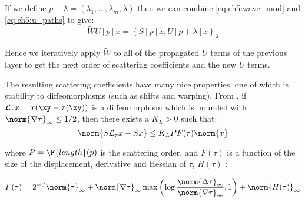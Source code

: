If we define $p + \lambda = (\lambda_1, \ldots, \lambda_m, \lambda)$ then we can
combine \eqref{eq:ch5:wave_mod} and \eqref{eq:ch5:u_paths} to give:
%
\begin{equation}
  \tilde{W} U[p] x = \left\{S[p]x, U[p+\lambda]x \right\}_{\lambda}
\end{equation}

Hence we iteratively apply $\tilde{W}$ to all of the propagated $U$ terms of
the previous layer to get the next order of scattering coefficients and
the new $U$ terms.

The resulting scattering coefficients have many nice properties, one of which is
stability to diffeomorphisms (such as shifts and warping). From
\cite{mallat_group_2012}, if $\mathcal{L}_\tau
x = x(\xy -\tau(\xy))$ is a diffeomorphism which is bounded with 
$\norm{\nabla \tau}_{\infty} \leq 1/2$, then there exists a $K_L > 0$ such
that:
%
\begin{equation}
  \norm{ S \mathcal{L}_{\tau}x  - S x} \leq K_L P F(\tau) \norm{x}
  \label{eq:ch5:stability}
\end{equation}

where $P = \F{length}(p)$ is the scattering order, and $F(\tau)$ is a function
of the size of the displacement, derivative and Hessian of $\tau$, $H(\tau)$
\cite{mallat_group_2012}: 

\begin{equation}
  F(\tau) = 2^{-J} \norm{\tau}_{\infty} + \norm{\nabla \tau}_{\infty} \max\left(\log
  \frac{\norm{\Delta \tau}_{\infty} }{\norm{\nabla \tau}_{\infty}}, 1 \right) +
  \norm{H(\tau)}_{\infty}
\end{equation}
